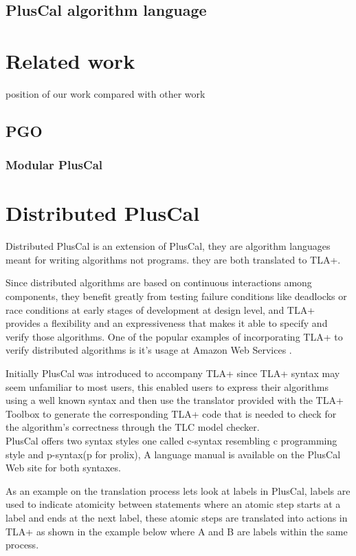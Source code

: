 \documentclass{thesul}
\begin{document}
\section{PlusCal algorithm language}
 

\chapter{Related work}
position of our work compared with other work

\section{PGO}

\subsection{Modular PlusCal}

\chapter{Distributed PlusCal}

Distributed PlusCal is an extension of PlusCal, they are algorithm languages meant for writing algorithms not programs. they are both translated to TLA+. 

Since distributed algorithms are based on continuous interactions among components, they benefit greatly from testing failure conditions like deadlocks or race conditions at early stages of development at design level, and TLA+ provides a flexibility and an expressiveness that makes it able to specify and verify those algorithms. One of the popular examples of incorporating TLA+ to verify distributed algorithms is it's usage at Amazon Web Services \cite{amazon}.

Initially PlusCal was introduced to accompany TLA+ since TLA+ syntax may seem unfamiliar to most users, this enabled users to express their algorithms using a well known syntax and then use the translator provided with the TLA+ Toolbox to generate the corresponding TLA+ code that is needed to check for the algorithm's correctness through the TLC model checker.
\hfill\\
PlusCal offers two syntax styles one called c-syntax resembling c programming style and p-syntax(p for prolix), A language manual is available on the PlusCal Web site for both syntaxes.

As an example on the translation process lets look at labels in PlusCal, labels are used to indicate atomicity between statements where an atomic step starts at a label and ends at the next label, these atomic steps are translated into actions in TLA+ as shown in the example below where A and B are labels within the same process.
\end{document}
